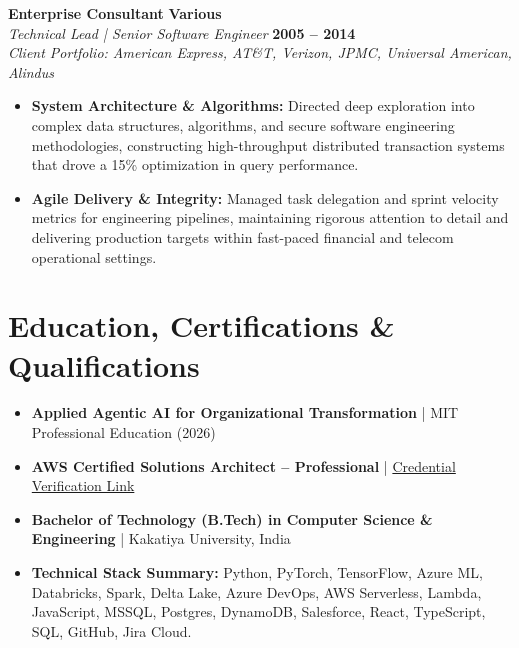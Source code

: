 \documentclass[9pt, letterpaper]{extarticle}
\begin{document}
\vspace{2pt}

\textbf{Enterprise Consultant} \hfill \textbf{Various} \\
\textit{Technical Lead | Senior Software Engineer} \hfill \textbf{2005 -- 2014} \\
\small\textit{Client Portfolio: American Express, AT\&T, Verizon, JPMC, Universal American, Alindus}
\begin{itemize}
    \item \textbf{System Architecture \& Algorithms:} Directed deep exploration into complex data structures, algorithms, and secure software engineering methodologies, constructing high-throughput distributed transaction systems that drove a 15\% optimization in query performance.
    \item \textbf{Agile Delivery \& Integrity:} Managed task delegation and sprint velocity metrics for engineering pipelines, maintaining rigorous attention to detail and delivering production targets within fast-paced financial and telecom operational settings.
\end{itemize}

\section{Education, Certifications \& Qualifications}
\begin{itemize}
    \item \textbf{Applied Agentic AI for Organizational Transformation} | MIT Professional Education (2026)
    \item \textbf{AWS Certified Solutions Architect -- Professional} | \href{https://www.credly.com/badges/7ef67d8d-67f2-4036-a8bf-8bbe73098a1f/linked_in?t=teze8g}{Credential Verification Link}
    \item \textbf{Bachelor of Technology (B.Tech) in Computer Science \& Engineering} | Kakatiya University, India
    \item \textbf{Technical Stack Summary:} Python, PyTorch, TensorFlow, Azure ML, Databricks, Spark, Delta Lake, Azure DevOps, AWS Serverless, Lambda, JavaScript, MSSQL, Postgres, DynamoDB, Salesforce, React, TypeScript, SQL, GitHub, Jira Cloud.
\end{itemize}
\end{document}
